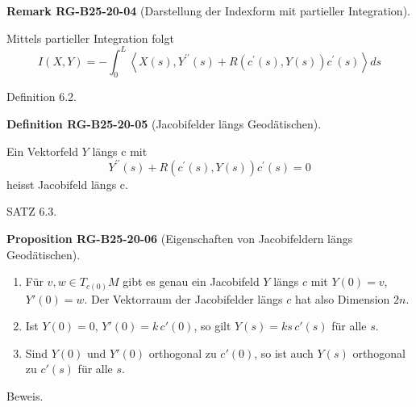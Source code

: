 \documentclass[10pt, letterpaper]{article}
\newcommand{\CustomHeading}[3]{%
  \par\medskip\noindent%
  \textbf{#1 #2} \textnormal{(#3)}.\enskip%
}
\newenvironment{DEF}[2]{\begin{unitbox}\CustomHeading{Definition}{#1}{#2}}{\end{unitbox}}
\newenvironment{PROP}[2]{\begin{unitbox}\CustomHeading{Proposition}{#1}{#2}}{\end{unitbox}}
\newenvironment{REM}[2]{\begin{unitbox}\CustomHeading{Remark}{#1}{#2}}{\end{unitbox}}
\begin{document}
\begin{REM}{RG-B25-20-04}{Darstellung der Indexform mit partieller Integration}
Mittels partieller Integration folgt
$$
I(X, Y)=-\int_{0}^{L}\left\langle X(s), Y^{\prime \prime}(s)+R\left(c^{\prime}(s), Y(s)\right) c^{\prime}(s)\right\rangle d s
$$
\end{REM}

Definition 6.2. 

\begin{DEF}{RG-B25-20-05}{Jacobifelder längs Geodätischen}
Ein Vektorfeld $Y$ längs c mit
\begin{equation*}
Y^{\prime \prime}(s)+R\left(c^{\prime}(s), Y(s)\right) c^{\prime}(s)=0 \tag{7}
\end{equation*}
heisst Jacobifeld längs c.
\end{DEF}


SATZ 6.3. 


\begin{PROP}{RG-B25-20-06}{Eigenschaften von Jacobifeldern längs Geodätischen}
\begin{enumerate}
  \item Für $v, w \in T_{c(0)} M$ gibt es genau ein Jacobifeld $Y$ längs $c$ mit $Y(0) = v$, $Y'(0) = w$. Der Vektorraum der Jacobifelder längs $c$ hat also Dimension $2n$.

  \item Ist $Y(0) = 0$, $Y'(0) = k\, c'(0)$, so gilt $Y(s) = k s\, c'(s)$ für alle $s$.

  \item Sind $Y(0)$ und $Y'(0)$ orthogonal zu $c'(0)$, so ist auch $Y(s)$ orthogonal zu $c'(s)$ für alle $s$.
\end{enumerate}
\end{PROP}


Beweis. 
\end{document}
